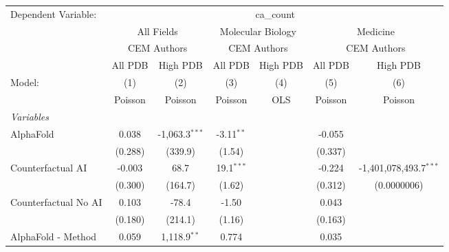 \begingroup
\centering
\begin{tabular}{lcccccc}
   \tabularnewline \midrule \midrule
   Dependent Variable: & \multicolumn{6}{c}{ca\_count}\\
 & \multicolumn{2}{c}{All Fields} & \multicolumn{2}{c}{Molecular Biology} & \multicolumn{2}{c}{Medicine} \\
\cmidrule(lr){2-3} \cmidrule(lr){4-5} \cmidrule(lr){6-7}
 & \multicolumn{2}{c}{CEM Authors} & \multicolumn{2}{c}{CEM Authors} & \multicolumn{2}{c}{CEM Authors} \\
\cmidrule(lr){2-3} \cmidrule(lr){4-5} \cmidrule(lr){6-7}
 & \multicolumn{1}{c}{All PDB} & \multicolumn{1}{c}{High PDB} & \multicolumn{1}{c}{All PDB} & \multicolumn{1}{c}{High PDB} & \multicolumn{1}{c}{All PDB} & \multicolumn{1}{c}{High PDB} \\
\cmidrule(lr){2-2} \cmidrule(lr){3-3} \cmidrule(lr){4-4} \cmidrule(lr){5-5} \cmidrule(lr){6-6} \cmidrule(lr){7-7}
   Model:                                                     & (1)      & (2)              & (3)          & (4)  & (5)          & (6)\\  
                                                              &  Poisson & Poisson          & Poisson      & OLS  & Poisson      & Poisson\\  
   \midrule
   \emph{Variables}\\
   AlphaFold                                                  & 0.038    & -1,063.3$^{***}$ & -3.11$^{**}$ &      & -0.055       &   \\   
                                                              & (0.288)  & (339.9)          & (1.54)       &      & (0.337)      &   \\   
   Counterfactual AI                                          & -0.003   & 68.7             & 19.1$^{***}$ &      & -0.224       & -1,401,078,493.7$^{***}$\\   
                                                              & (0.300)  & (164.7)          & (1.62)       &      & (0.312)      & (0.0000006)\\   
   Counterfactual No AI                                       & 0.103    & -78.4            & -1.50        &      & 0.043        &   \\   
                                                              & (0.180)  & (214.1)          & (1.16)       &      & (0.163)      &   \\   
   AlphaFold - Method                                         & 0.059    & 1,118.9$^{**}$   & 0.774        &      & 0.035        &   \\   

\end{tabular}
